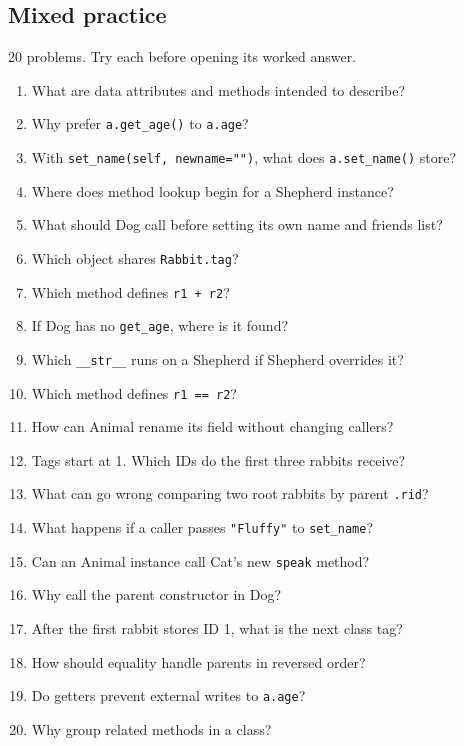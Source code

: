 \documentclass[11pt]{article}
\begin{document}
\begin{keepsection}
\section{Mixed practice}

20 problems. Try each before opening its worked answer.

\begin{enumerate}
\item What are data attributes and methods intended to describe?
\item Why prefer \texttt{a.get\_age()} to \texttt{a.age}?
\item With \texttt{set\_name(self, newname="")}, what does \texttt{a.set\_name()} store?
\item Where does method lookup begin for a Shepherd instance?
\item What should Dog call before setting its own name and friends list?
\item Which object shares \texttt{Rabbit.tag}?
\item Which method defines \texttt{r1 + r2}?
\item If Dog has no \texttt{get\_age}, where is it found?
\item Which \texttt{\_\_str\_\_} runs on a Shepherd if Shepherd overrides it?
\item Which method defines \texttt{r1 == r2}?
\item How can Animal rename its field without changing callers?
\item Tags start at 1. Which IDs do the first three rabbits receive?
\item What can go wrong comparing two root rabbits by parent \texttt{.rid}?
\item What happens if a caller passes \texttt{"Fluffy"} to \texttt{set\_name}?
\item Can an Animal instance call Cat’s new \texttt{speak} method?
\item Why call the parent constructor in Dog?
\item After the first rabbit stores ID 1, what is the next class tag?
\item How should equality handle parents in reversed order?
\item Do getters prevent external writes to \texttt{a.age}?
\item Why group related methods in a class?
\end{enumerate}

\end{keepsection}
\end{document}

